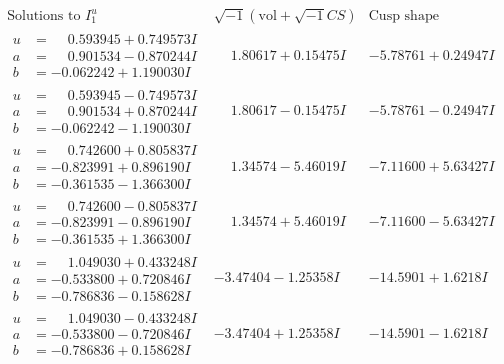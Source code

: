 \documentclass[1p]{elsarticle_modified}
\theoremstyle{definition}
\newcommand{\I}{\sqrt{-1}}
\begin{document}
$$\begin{array}{c|c|c}  
\text{Solutions to }I^u_{1}& \I (\text{vol} + \sqrt{-1}CS) & \text{Cusp shape}\\
 \hline 
\begin{aligned}
u &= \phantom{-}0.593945 + 0.749573 I \\
a &= \phantom{-}0.901534 - 0.870244 I \\
b &= -0.062242 + 1.190030 I\end{aligned}
 & \phantom{-}1.80617 + 0.15475 I & -5.78761 + 0.24947 I \\ \hline\begin{aligned}
u &= \phantom{-}0.593945 - 0.749573 I \\
a &= \phantom{-}0.901534 + 0.870244 I \\
b &= -0.062242 - 1.190030 I\end{aligned}
 & \phantom{-}1.80617 - 0.15475 I & -5.78761 - 0.24947 I \\ \hline\begin{aligned}
u &= \phantom{-}0.742600 + 0.805837 I \\
a &= -0.823991 + 0.896190 I \\
b &= -0.361535 - 1.366300 I\end{aligned}
 & \phantom{-}1.34574 - 5.46019 I & -7.11600 + 5.63427 I \\ \hline\begin{aligned}
u &= \phantom{-}0.742600 - 0.805837 I \\
a &= -0.823991 - 0.896190 I \\
b &= -0.361535 + 1.366300 I\end{aligned}
 & \phantom{-}1.34574 + 5.46019 I & -7.11600 - 5.63427 I \\ \hline\begin{aligned}
u &= \phantom{-}1.049030 + 0.433248 I \\
a &= -0.533800 + 0.720846 I \\
b &= -0.786836 - 0.158628 I\end{aligned}
 & -3.47404 - 1.25358 I & -14.5901 + 1.6218 I \\ \hline\begin{aligned}
u &= \phantom{-}1.049030 - 0.433248 I \\
a &= -0.533800 - 0.720846 I \\
b &= -0.786836 + 0.158628 I\end{aligned}
 & -3.47404 + 1.25358 I & -14.5901 - 1.6218 I \\ \hline\begin{aligned}

\end{aligned}
\end{array}$$
\end{document}
